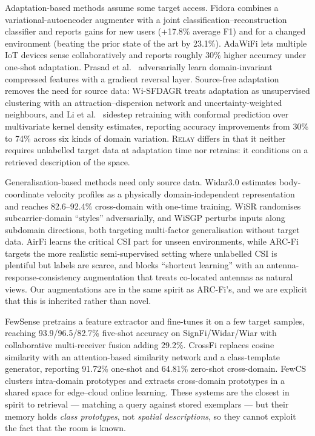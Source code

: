 \documentclass[conference]{IEEEtran}
\newcommand{\method}{\textsc{Relay}}
\begin{document}
Adaptation-based methods assume some target access. Fidora \cite{Chen2022Fidora} combines a
variational-autoencoder augmenter with a joint classification--reconstruction classifier
and reports gains for new users (+17.8\% average F1) and for a changed environment
(beating the prior state of the art by 23.1\%). AdaWiFi \cite{Zheng2025AdaWiFi} lets
multiple IoT devices sense collaboratively and reports roughly 30\% higher accuracy under
one-shot adaptation. Prasad et al.\ \cite{Prasad2024DANN} adversarially learn
domain-invariant compressed features with a gradient reversal layer. Source-free
adaptation removes the need for source data: Wi-SFDAGR \cite{Yan2025WiSFDAGR} treats
adaptation as unsupervised clustering with an attraction--dispersion network and
uncertainty-weighted neighbours, and Li et al.\ \cite{Li2026Conformal} sidestep retraining
with conformal prediction over multivariate kernel density estimates, reporting accuracy
improvements from 30\% to 74\% across six kinds of domain variation.
\method{} differs in that it neither requires unlabelled target data at
adaptation time nor retrains: it conditions on a retrieved description of the space.

Generalisation-based methods need only source data. Widar3.0 \cite{Zheng2019Widar3}
estimates body-coordinate velocity profiles as a physically domain-independent
representation and reaches 82.6--92.4\% cross-domain with one-time training. WiSR
\cite{Liu2024WiSR} randomises subcarrier-domain ``styles'' adversarially, and WiSGP
\cite{Liu2024WiSGP} perturbs inputs along subdomain directions, both targeting
multi-factor generalisation without target data. AirFi \cite{Wang2022AirFi} learns the
critical CSI part for unseen environments, while ARC-Fi \cite{Xu2023ARCFi} targets the
more realistic semi-supervised setting where unlabelled CSI is plentiful but labels are
scarce, and blocks ``shortcut learning'' with an antenna-response-consistency augmentation
that treats co-located antennas as natural views. Our augmentations are in the same spirit
as ARC-Fi's, and we are explicit that this is inherited rather than novel.

FewSense \cite{Yin2022FewSense} pretrains a feature extractor and fine-tunes it on a few
target samples, reaching 93.9/96.5/82.7\% five-shot accuracy on SignFi/Widar/Wiar with
collaborative multi-receiver fusion adding 29.2\%. CrossFi \cite{Zhao2024CrossFi} replaces
cosine similarity with an attention-based similarity network and a class-template
generator, reporting 91.72\% one-shot and 64.81\% zero-shot cross-domain. FewCS
\cite{Yang2023FewCS} clusters intra-domain prototypes and extracts cross-domain prototypes
in a shared space for edge--cloud online learning. These systems are the closest in spirit
to retrieval --- matching a query against stored exemplars --- but their memory holds
\emph{class prototypes}, not \emph{spatial descriptions}, so they cannot exploit the fact
that the room is known.
\end{document}

